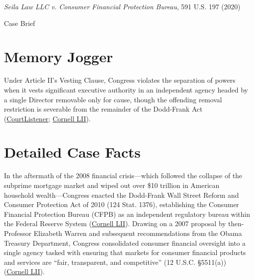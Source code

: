 \documentclass[12pt]{article}
\begin{document}
\begin{center}
{\LARGE \textit{Seila Law LLC v. Consumer Financial Protection Bureau}, 591 U.S. 197 (2020)\par}
\vspace{0.8em}
{\large Case Brief\par}
\end{center}
\vspace{1em}

\section{Memory Jogger}

Under Article II's Vesting Clause, Congress violates the separation of powers when it vests significant executive authority in an independent agency headed by a single Director removable only for cause, though the offending removal restriction is severable from the remainder of the Dodd-Frank Act (\href{https://www.courtlistener.com/opinion/4764451/seila-law-llc-v-consumer-financial-protection-bureau/}{CourtListener}; \href{https://www.law.cornell.edu/supremecourt/text/19-7}{Cornell LII}).

\section{Detailed Case Facts}

In the aftermath of the 2008 financial crisis---which followed the collapse of the subprime mortgage market and wiped out over \$10 trillion in American household wealth---Congress enacted the Dodd-Frank Wall Street Reform and Consumer Protection Act of 2010 (124 Stat. 1376), establishing the Consumer Financial Protection Bureau (CFPB) as an independent regulatory bureau within the Federal Reserve System (\href{https://www.law.cornell.edu/supremecourt/text/19-7}{Cornell LII}). Drawing on a 2007 proposal by then-Professor Elizabeth Warren and subsequent recommendations from the Obama Treasury Department, Congress consolidated consumer financial oversight into a single agency tasked with ensuring that markets for consumer financial products and services are ``fair, transparent, and competitive'' (12 U.S.C. \S 5511(a)) (\href{https://www.law.cornell.edu/supremecourt/text/19-7}{Cornell LII}).
\end{document}
